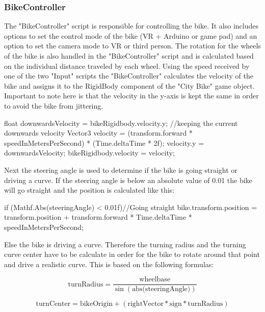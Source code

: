 \documentclass[english,notitlepage,smartquotes]{hgbreport}
\begin{document}
\subsubsection{BikeController}
The "BikeController" script is responsible for controlling the bike. 
It also includes options to set the control mode of the bike (VR + Arduino or game pad) and an option to set the camera mode to VR or third person. The rotation for the wheels of the bike is also handled in the "BikeController" script and is calculated based on the individual distance traveled by each wheel.
Using the speed received by one of the two "Input" scripts the "BikeController" calculates the velocity of the bike and assigns it to the RigidBody component of the "City Bike" game object. Important to note here is that the velocity in the y-axis is kept the same in order to avoid the bike from jittering. 
\begin{CsCode}
	float downwardsVelocity = bikeRigidbody.velocity.y; //keeping the current downwards velocity
	Vector3 velocity = (transform.forward * speedInMetersPerSecond) * (Time.deltaTime * 2f);
	velocity.y = downwardsVelocity;
	bikeRigidbody.velocity = velocity;                       
\end{CsCode}
Next the steering angle is used to determine if the bike is going straight or driving a curve. 
If the steering angle is below an absolute value of 0.01 the bike will go straight and the position is calculated like this:
\begin{CsCode}
	if (Mathf.Abs(steeringAngle) < 0.01f)//Going straight
	{
		bike.transform.position = transform.position + transform.forward * Time.deltaTime * speedInMetersPerSecond;
	}                 
\end{CsCode}
Else the bike is driving a curve. Therefore the turning radius and the turning curve center have to be calculate in order for the bike to rotate around that point and drive a realistic curve. 
This is based on the following formulas:

\begin{equation}
\text{turnRadius} = \frac{\text{wheelbase}}{\sin(\text{abs(steeringAngle)})}
\end{equation}

\begin{equation}
\text{turnCenter} = \text{bikeOrigin} + (\text{rightVector} * \text{sign} * \text{turnRadius})
\end{equation}
\end{document}

